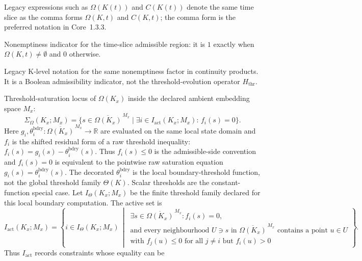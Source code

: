 \begin{description}
        Legacy expressions such as \(\Omega(K(t))\) and \(C(K(t))\)
        denote the same time slice as the comma forms \(\Omega(K,t)\) and
        \(C(K,t)\); the comma form is the preferred notation in Core~1.3.3.
  \item[\(\mathbf{1}_{\{\Omega(K,t)\neq\emptyset\}}\)] Nonemptiness indicator for
        the time-slice admissible region: it is \(1\) exactly when
        \(\Omega(K,t)\neq\emptyset\) and \(0\) otherwise.
  \item[\(H(\Omega(K_x))\)] Legacy K-level notation for the same nonemptiness
        factor in continuity products. It is a Boolean admissibility indicator,
        not the threshold-evolution operator \(H_{\mathrm{thr}}\).
  \item[\(\Sigma_{\Omega}(K_x;M_x)\)] Threshold-saturation locus of
        \(\Omega(K_x)\) inside the declared ambient embedding space \(M_x\):
        \[
          \Sigma_{\Omega}(K_x;M_x)=
          \{s\in\overline{\Omega(K_x)}^{\,M_x}\mid
          \exists i\in I_{\mathrm{act}}(K_x;M_x):\,f_i(s)=0\}.
        \]
        Here \(g_i,\theta_i^{\mathrm{bdry}}:
        \overline{\Omega(K_x)}^{\,M_x}\to\mathbb{R}\) are evaluated on the same
        local state domain and \(f_i\) is the shifted residual form of a raw
        threshold inequality:
        \(f_i(s)=g_i(s)-\theta_i^{\mathrm{bdry}}(s)\). Thus \(f_i(s)\le0\) is
        the admissible-side convention and \(f_i(s)=0\) is equivalent to the
        pointwise raw saturation equation \(g_i(s)=
        \theta_i^{\mathrm{bdry}}(s)\). The decorated
        \(\theta_i^{\mathrm{bdry}}\) is the local boundary-threshold function,
        not the global threshold family \(\Theta(K)\). Scalar thresholds are
        the constant-function special case. Let
        \(I_{\Theta}(K_x;M_x)\) be the finite threshold family declared for this
        local boundary computation. The active set is
        \[
          I_{\mathrm{act}}(K_x;M_x)=
          \left\{i\in I_{\Theta}(K_x;M_x)\,\middle|\,
          \begin{array}{l}
          \exists s\in\overline{\Omega(K_x)}^{\,M_x}: f_i(s)=0,\\
          \text{and every neighbourhood }U\ni s\text{ in }
          \overline{\Omega(K_x)}^{\,M_x}\text{ contains a point }u\in U\\
          \text{with } f_j(u)\le0\text{ for all }j\ne i\text{ but }f_i(u)>0
          \end{array}\right\}.
        \]
        Thus \(I_{\mathrm{act}}\) records constraints whose equality can be

\end{description}
